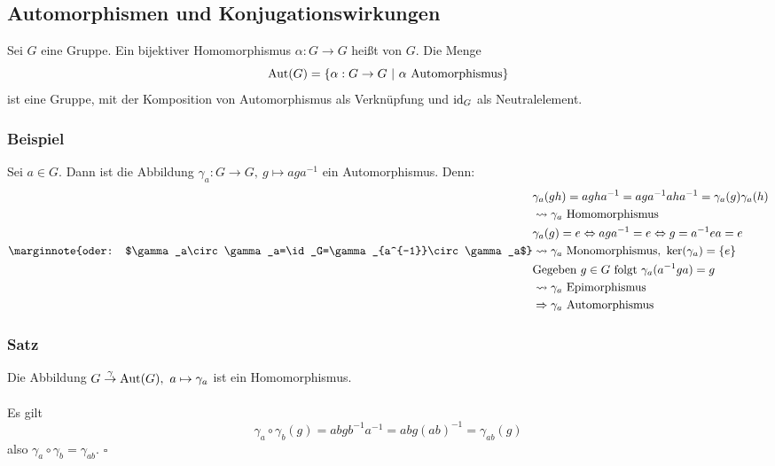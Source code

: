 
\subsection{Automorphismen und Konjugationswirkungen}
\label{sub:automor}
Sei $G$ eine Gruppe. 
Ein bijektiver Homomorphismus $\alpha:G\to G$ heißt  von $G$. 
Die Menge 
\[
\operatorname{Aut}(G)=\{\alpha:G\to G~|~\alpha \text{ Automorphismus}\} 
\]
ist eine Gruppe, mit der Komposition von Automorphismus als Verknüpfung und $\operatorname{id}_G$ als Neutralelement.

\subsubsection*{Beispiel}
Sei $a\in G$. 
Dann ist die Abbildung $\gamma_a:G\to G,~g\mapsto aga^{-1}$ ein Automorphismus. 
Denn:
\begin{equation*}
\begin{aligned}
	&\gamma_a(gh)=agha^{-1}=aga^{-1}aha^{-1}=\gamma_a(g)\gamma_a(h)\\
	&\rightsquigarrow \gamma_a \text{ Homomorphismus}\\
	&\gamma_a(g)=e \Leftrightarrow aga^{-1}=e \Leftrightarrow g=a^{-1}ea=e\\
	\marginnote{oder: $\gamma_a\circ\gamma_a=\id_G=\gamma_{a^{-1}}\circ\gamma_a$}
	&\rightsquigarrow \gamma_a \text{ Monomorphismus},~ \ker(\gamma_a)=\{e\}\\
	&\text{Gegeben } g\in G \text{ folgt } \gamma_a(a^{-1}ga)=g\\
	&\rightsquigarrow \gamma_a \text{ Epimorphismus}\\
	&\Rightarrow \gamma_a \text{ Automorphismus}
\end{aligned}
\end{equation*}

\subsubsection*{Satz}
Die Abbildung $G\stackrel{\gamma}{\to} \operatorname{Aut}(G),~a\mapsto \gamma_a$ ist ein Homomorphismus.\\

\\
Es gilt 
\[
\gamma_a\circ\gamma_b(g)=abgb^{-1}a^{-1}=abg(ab)^{-1}=\gamma_{ab}(g) 
\]
also $\gamma_a\circ\gamma_b=\gamma_{ab}$.
\hfill $\square$\\


